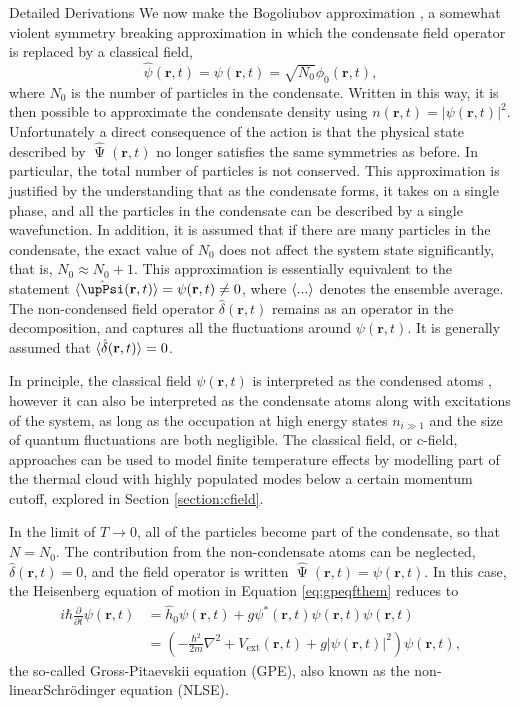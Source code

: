 \begin{chapter}{Detailed Derivations\label{app:App2}}
We now make the Bogoliubov approximation \cite{bogo47}, a somewhat violent symmetry breaking approximation in which the condensate field operator is replaced by a classical field, 
\begin{equation*}
\hat{\psi}(\mathbf{r},t) = \psi(\mathbf{r},t) = \sqrt{N_0}\phi_0(\mathbf{r},t),
\end{equation*}
where $N_0$ is the number of particles in the condensate. Written in this way, it is then possible to approximate the condensate density using $n(\mathbf{r},t) = |\psi(\mathbf{r},t)|^2$. Unfortunately a direct consequence of the action is that the physical state described by $\hat{\upPsi}(\mathbf{r},t)$ no longer satisfies the same symmetries as before. In particular, the total number of particles is not conserved. This approximation is justified by the understanding that as the condensate forms, it takes on a single phase, and all the particles in the condensate can be described by a single wavefunction. In addition, it is assumed that if there are many particles in the condensate, the exact value of $N_0$ does not affect the system state significantly, that is, $N_0 \approx N_0+1$. This approximation is essentially equivalent to the statement $\braket{\hat{\upPsi}(\mathbf{r},t)} = \psi(\mathbf{r},t) \ne 0$, where $\braket{...}$ denotes the ensemble average. The non-condensed field operator $\hat{\delta}(\mathbf{r},t)$ remains as an operator in the decomposition, and captures all the fluctuations around $\psi(\mathbf{r},t)$. It is generally assumed that $\braket{\hat{\delta}(\mathbf{r},t)}=0$.

In principle, the classical field $\psi(\mathbf{r},t)$ is interpreted as the condensed atoms , however it can also be interpreted as the condensate atoms along with excitations of the system, as long as the occupation at high energy states $n_{i\gg1}$ and the size of quantum fluctuations are both negligible. The classical field, or c-field, approaches can be used to model finite temperature effects by modelling part of the thermal cloud with highly populated modes below a certain momentum cutoff, explored in Section \ref{section:cfield}.

In the limit of $T\rightarrow0$, all of the particles become part of the condensate, so that $N=N_0$. The contribution from the non-condensate atoms can be neglected, $\hat{\delta}(\mathbf{r},t)=0$, and the field operator is written $\hat{\upPsi}(\mathbf{r},t) = \psi(\mathbf{r},t)$. In this case, the Heisenberg equation of motion in Equation \ref{eq:gpeqfthem} reduces to
\begin{equation*}
\begin{split}
i \hbar\frac{\partial}{\partial t}\psi(\mathbf{r},t) &= \hat{h}_0\psi(\mathbf{r},t) + g\psi^*(\mathbf{r},t)\psi(\mathbf{r},t)\psi(\mathbf{r},t)\\
&= \left ( -\frac{\hbar^2}{2m}\nabla^2+V_{\mathrm{ext}}(\mathbf{r},t) + g|\psi(\mathbf{r},t)|^2 \right ) \psi(\mathbf{r},t),
\end{split}
\end{equation*}
the so-called Gross-Pitaevskii equation (GPE), also known as the non-linear\;Schr\"odinger equation (NLSE).


\end{chapter}
